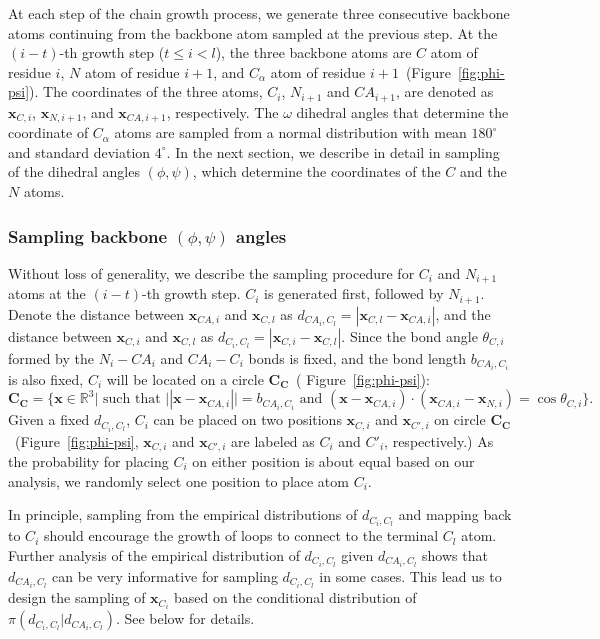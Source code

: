 At each step of the chain growth process, we generate three
consecutive backbone atoms continuing from the backbone atom sampled
at the previous step. At the $(i-t)$-th growth step ($t \leq i <
l$), the three backbone atoms are $C$ atom of residue $i$, $N$ atom
of residue $i+1$, and $C_\alpha$ atom of residue
$i+1$~(Figure~\ref{fig:phi-psi}). The coordinates of the three
atoms, $C_{i}$, $N_{i+1}$ and $CA_{i+1}$, are denoted as
$\mathbf{x}_{C,i}$, $\mathbf{x}_{N, i+1}$, and $\mathbf{x}_{CA,
i+1}$, respectively. The $\omega$ dihedral angles that determine the
coordinate of $C_\alpha$ atoms are sampled from a normal
distribution with mean $180^{\circ}$ and standard deviation
$4^{\circ}$. In the next section, we describe in detail in sampling
of the dihedral angles $(\phi, \psi)$, which determine the
coordinates of the $C$ and the $N$ atoms.

\subsubsection*{Sampling backbone $(\phi, \psi)$ angles}
Without loss of generality, we describe the sampling procedure for
$C_i$ and $N_{i+1}$ atoms at the $(i-t)$-th growth step. $C_i$ is
generated first, followed by $N_{i+1}$. Denote the distance between
$\mathbf{x}_{CA,i}$ and $\mathbf{x}_{C,l}$ as $d_{CA_i, C_l}
 = |\mathbf{x}_{C,l} - \mathbf{x}_{CA,i}|$, and the
distance between $\mathbf{x}_{C,i}$ and $\mathbf{x}_{C,l}$ as
$d_{C_i, C_l} = | \mathbf{x}_{C,i} - \mathbf{x}_{C,l}|$. Since the
bond angle $\theta_{C,i}$ formed by the $N_i-CA_i$ and $CA_i - C_i$
bonds is fixed, and the bond length $b_{CA_i,C_i}$ is also fixed,
$C_i$ will be located on a circle $\mathbf{C_C}$~(
Figure~\ref{fig:phi-psi}):
\begin{equation}
\label{eqn:circle-C} \mathbf{C_C} = \{\mathbf{x} \in \mathbb{R}^3 |
\mbox{ such that }||\mathbf{x} - \mathbf{x}_{CA,i}|| = b_{CA_i,C_i}
\mbox{ and } (\mathbf{x} - \mathbf{x}_{CA,i}) \cdot
(\mathbf{x}_{CA,i} - \mathbf{x}_{N,i}) = \cos \theta_{C,i} \}.
\end{equation}
Given a fixed $d_{C_i, C_l}$, $C_i$ can be placed on two positions
$\mathbf{x}_{C,i}$ and $\mathbf{x}_{C',i}$ on circle
$\mathbf{C_C}$~(Figure~\ref{fig:phi-psi}, $\mathbf{x}_{C,i}$ and
$\mathbf{x}_{C',i}$ are labeled as $C_i$ and $C'_i$, respectively.)
As the probability for placing $C_i$ on either position is about
equal based on our analysis, we randomly select one position to
place atom $C_i$.

In principle, sampling from the empirical distributions of $d_{C_i,
C_l}$ and mapping back to $C_i$ should encourage the growth of loops
to connect to the terminal $C_l$ atom. Further analysis of the
empirical distribution of $d_{C_i,C_l}$ given $d_{CA_i,C_l}$ shows
that $d_{CA_i,C_l}$ can be very informative for sampling
$d_{C_i,C_l}$ in some cases. This lead us to design the sampling of
$\mathbf{x}_{C_i}$ based on the conditional distribution of
$\pi(d_{C_i,C_l} | d_{CA_i,C_l})$. See below for details.

